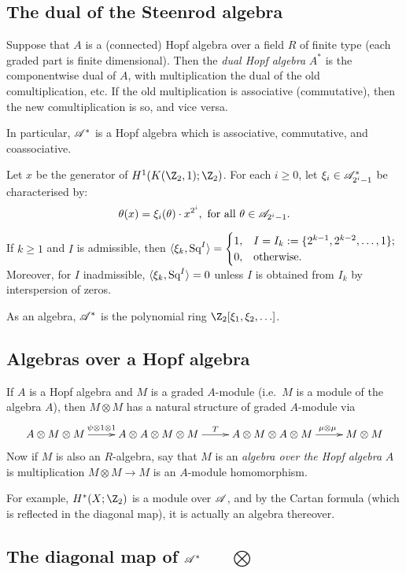 \documentclass[11pt]{article}
\begin{document}
\subsection{The dual of the Steenrod algebra}
Suppose that $A$ is a (connected) Hopf algebra over a field $R$ of finite type (each graded part is finite dimensional). Then the \emph{dual Hopf algebra} $A^*$ is the componentwise dual of $A$, with multiplication the dual of the old comultiplication, etc. If the old multiplication is associative (commutative), then the new comultiplication is so, and vice versa.

In particular, $\mathscr{A}^*$ is a Hopf algebra which is associative, commutative, and coassociative.

Let $x$ be the generator of $H^1(K(\Z_2,1);\Z_2)$. For each $i\geq0$, let $\xi_i\in\mathscr{A}^*_{2^i-1}$ be characterised by:
\[\theta(x)=\xi_i(\theta)\cdot x^{2^i},\text{ for all }\theta\in\mathscr{A}_{2^i-1}.\]
\begin{prop*}
If $k\geq1$ and $I$ is admissible, then $\langle\xi_k,\textup{Sq}^I\rangle=\begin{cases}1,&I=I_k:=\{2^{k-1},2^{k-2},\ldots,1\};\\0,&\textup{otherwise.}\end{cases}$ Moreover, for $I$ inadmissible, $\langle\xi_k,\textup{Sq}^I\rangle=0$ unless $I$ is obtained from $I_k$ by interspersion of zeros.
\end{prop*}
As an algebra, $\mathscr{A}^*$ is the polynomial ring $\Z_2[\xi_1,\xi_2,\ldots]$.

\subsection{Algebras over a Hopf algebra}
If $A$ is a Hopf algebra and $M$ is a graded $A$-module (i.e.\ $M$ is a module of the algebra $A$), then $M\otimes M$ has a natural structure of graded $A$-module via
\[\xymatrix{
A\otimes M\otimes M\ar[r]^{\psi\otimes1\otimes1\ \ \ }&A\otimes A\otimes M\otimes M\ar[r]^T&A\otimes M\otimes A\otimes M\ar[r]^{\qquad\mu\otimes \mu\ }&M\otimes M
}\]
Now if $M$ is also an $R$-algebra, say that $M$ is an \emph{algebra over the Hopf algebra} $A$ is multiplication $M\otimes M\to M$ is an $A$-module homomorphism.

For example, $H^*(X;\Z_2)$ is a module over $\mathscr{A}$, and by the Cartan formula (which is reflected in the diagonal map), it is actually an algebra thereover.
\subsection{The diagonal map of \texorpdfstring{$\mathscr{A}^*$\ \ \ $\bigotimes$}{A}}
\end{document}
